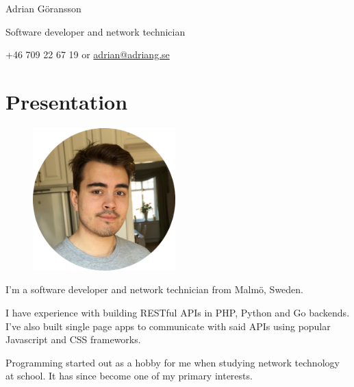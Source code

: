 \documentclass[a4paper, 11pt]{article}
\begin{document}
\chead{}
\rhead{\today}
\cfoot{}
\rfoot{\thepage}
\renewcommand{\headrulewidth}{0.4pt}
\renewcommand{\footrulewidth}{0.4pt}

    \begin{center}
        \begin{Huge}
            Adrian Göransson
        \end{Huge}

        \begin{large}
            Software developer and network technician
        \end{large}

        +46 709 22 67 19 or \href{mailto:adrian@adriang.se}{adrian@adriang.se}
    \end{center}

    \section*{Presentation}

        \begin{figure}\centering
            \includegraphics[width=5.5cm]{profile.png}
        \end{figure}

        I'm a software developer and network technician from Malmö, Sweden.

        I have experience with building RESTful APIs in PHP, Python and Go backends.
        I've also built single page apps to communicate with said APIs using popular Javascript and CSS frameworks.

        Programming started out as a hobby for me when studying network technology at school. It has since become one of my primary interests.
\end{document}

